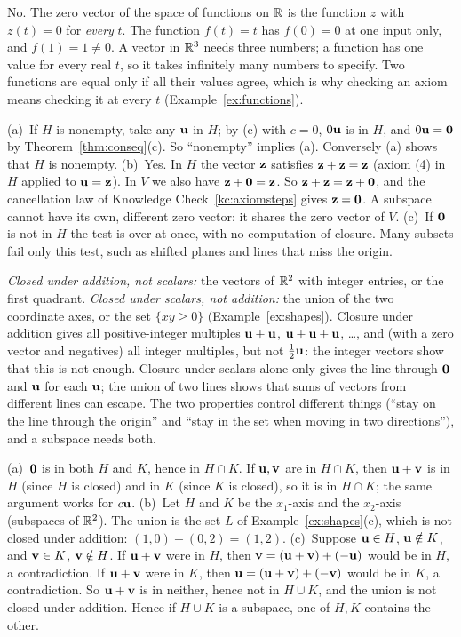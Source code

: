 \documentclass[11pt]{article}
\begin{document}
\begin{description}[leftmargin=0pt,itemsep=5pt]
  \item[Pause and think \ref{think:function}.] No. The zero vector of the space of functions on $\mathbb{R}$ is the function $z$ with $z(t)=0$ for \emph{every} $t$. The function $f(t)=t$ has $f(0)=0$ at one input only, and $f(1)=1\neq0$. A vector in $\mathbb{R}^3$ needs three numbers; a function has one value for every real $t$, so it takes infinitely many numbers to specify. Two functions are equal only if all their values agree, which is why checking an axiom means checking it at every $t$ (Example~\ref{ex:functions}).
  \item[Pause and think \ref{think:zero}.] (a)~If $H$ is nonempty, take any $\mathbf{u}$ in $H$; by (c) with $c=0$, $0\mathbf{u}$ is in $H$, and $0\mathbf{u}=\mathbf{0}$ by Theorem~\ref{thm:conseq}(c). So ``nonempty'' implies (a). Conversely (a) shows that $H$ is nonempty. (b)~Yes. In $H$ the vector $\mathbf{z}$ satisfies $\mathbf{z}+\mathbf{z}=\mathbf{z}$ (axiom (4) in $H$ applied to $\mathbf{u}=\mathbf{z}$). In $V$ we also have $\mathbf{z}+\mathbf{0}=\mathbf{z}$. So $\mathbf{z}+\mathbf{z}=\mathbf{z}+\mathbf{0}$, and the cancellation law of Knowledge Check~\ref{kc:axiomsteps} gives $\mathbf{z}=\mathbf{0}$. A subspace cannot have its own, different zero vector: it shares the zero vector of $V$. (c)~If $\mathbf{0}$ is not in $H$ the test is over at once, with no computation of closure. Many subsets fail only this test, such as shifted planes and lines that miss the origin.
  \item[Pause and think \ref{think:both}.] \emph{Closed under addition, not scalars:} the vectors of $\mathbb{R}^2$ with integer entries, or the first quadrant. \emph{Closed under scalars, not addition:} the union of the two coordinate axes, or the set $\{xy\geq0\}$ (Example~\ref{ex:shapes}). Closure under addition gives all positive-integer multiples $\mathbf{u}+\mathbf{u}$, $\mathbf{u}+\mathbf{u}+\mathbf{u}$, \dots, and (with a zero vector and negatives) all integer multiples, but not $\tfrac12\mathbf{u}$: the integer vectors show that this is not enough. Closure under scalars alone only gives the line through $\mathbf{0}$ and $\mathbf{u}$ for each $\mathbf{u}$; the union of two lines shows that sums of vectors from different lines can escape. The two properties control different things (``stay on the line through the origin'' and ``stay in the set when moving in two directions''), and a subspace needs both.
  \item[Pause and think \ref{think:inter}.] (a)~$\mathbf{0}$ is in both $H$ and $K$, hence in $H\cap K$. If $\mathbf{u},\mathbf{v}$ are in $H\cap K$, then $\mathbf{u}+\mathbf{v}$ is in $H$ (since $H$ is closed) and in $K$ (since $K$ is closed), so it is in $H\cap K$; the same argument works for $c\mathbf{u}$. (b)~Let $H$ and $K$ be the $x_1$-axis and the $x_2$-axis (subspaces of $\mathbb{R}^2$). The union is the set $L$ of Example~\ref{ex:shapes}(c), which is not closed under addition: $(1,0)+(0,2)=(1,2)$. (c)~Suppose $\mathbf{u}\in H$, $\mathbf{u}\notin K$, and $\mathbf{v}\in K$, $\mathbf{v}\notin H$. If $\mathbf{u}+\mathbf{v}$ were in $H$, then $\mathbf{v}=(\mathbf{u}+\mathbf{v})+(-\mathbf{u})$ would be in $H$, a contradiction. If $\mathbf{u}+\mathbf{v}$ were in $K$, then $\mathbf{u}=(\mathbf{u}+\mathbf{v})+(-\mathbf{v})$ would be in $K$, a contradiction. So $\mathbf{u}+\mathbf{v}$ is in neither, hence not in $H\cup K$, and the union is not closed under addition. Hence if $H\cup K$ is a subspace, one of $H,K$ contains the other.

\end{description}
\end{document}
